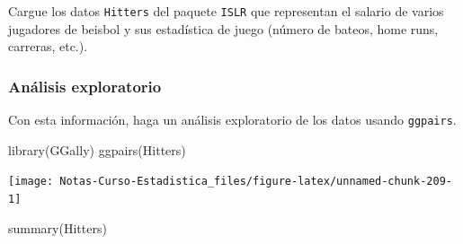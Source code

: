 \documentclass[
  12pt,
]{book}
\newenvironment{Shaded}{\begin{snugshade}}{\end{snugshade}}
\newcommand{\FunctionTok}[1]{\textcolor[rgb]{0.00,0.00,0.00}{#1}}
\newcommand{\NormalTok}[1]{#1}
\theoremstyle{definition}
\theoremstyle{definition}
\theoremstyle{definition}
\theoremstyle{definition}
\theoremstyle{remark}
\begin{document}
Cargue los datos \texttt{Hitters} del paquete \texttt{ISLR} que representan el salario de varios jugadores de beisbol y sus estadística de juego (número de bateos, home runs, carreras, etc.).

\hypertarget{anuxe1lisis-exploratorio}{%
\subsubsection{Análisis exploratorio}\label{anuxe1lisis-exploratorio}}

Con esta información, haga un análisis exploratorio de los datos usando \texttt{ggpairs}.

\begin{Shaded}
\begin{Highlighting}[]
\FunctionTok{library}\NormalTok{(GGally)}
\FunctionTok{ggpairs}\NormalTok{(Hitters)}
\end{Highlighting}
\end{Shaded}

\begin{center}\texttt{[image: Notas-Curso-Estadistica\_files/figure-latex/unnamed-chunk-209-1]} \end{center}

\begin{Shaded}
\begin{Highlighting}[]
\FunctionTok{summary}\NormalTok{(Hitters)}
\end{Highlighting}
\end{Shaded}
\end{document}
